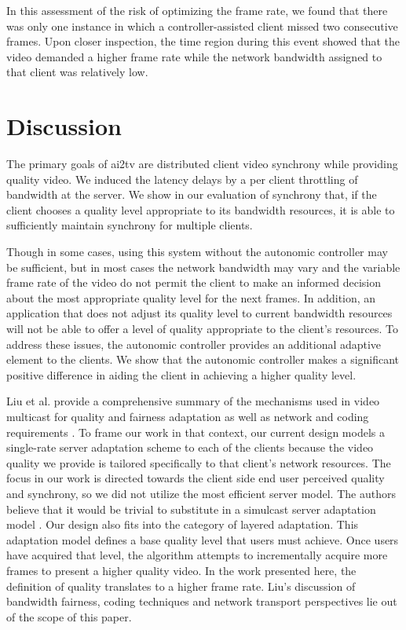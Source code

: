 \documentclass{sig-alternate}
\begin{document}
In this assessment of the risk of optimizing the frame rate, we found
that there was only one instance in which a controller-assisted client
missed two consecutive frames.  Upon closer inspection, the time
region during this event showed that the video demanded a higher frame
rate while the network bandwidth assigned to that client was
relatively low.


\section{Discussion} \label{discussion}
The primary goals of ai2tv are distributed client video synchrony
while providing quality video.  We induced the latency delays by a per
client throttling of bandwidth at the server.  We show in our
evaluation of synchrony that, if the client chooses a quality level
appropriate to its bandwidth resources, it is able to sufficiently
maintain synchrony for multiple clients.

Though in some cases, using this system without the autonomic
controller may be sufficient, but in most cases the network bandwidth
may vary and the variable frame rate of the video do not permit the
client to make an informed decision about the most appropriate quality
level for the next frames.  In addition, an application that does not
adjust its quality level to current bandwidth resources will not be
able to offer a level of quality appropriate to the client's
resources.  To address these issues, the autonomic controller provides
an additional adaptive element to the clients.  We show that the
autonomic controller makes a significant positive difference in aiding
the client in achieving a higher quality level.

Liu et al. provide a comprehensive summary of the mechanisms used in
video multicast for quality and fairness adaptation as well as network
and coding requirements \cite{LIU}.  To frame our work in that
context, our current design models a single-rate server adaptation
scheme to each of the clients because the video quality we provide is
tailored specifically to that client's network resources.  The focus
in our work is directed towards the client side end user perceived
quality and synchrony, so we did not utilize the most efficient server
model.  The authors believe that it would be trivial to substitute in
a simulcast server adaptation model \cite{CHEUNG,LI}.  Our design also
fits into the category of layered adaptation.  This adaptation model
defines a base quality level that users must achieve.  Once users have
acquired that level, the algorithm attempts to incrementally acquire
more frames to present a higher quality video.  In the work presented
here, the definition of quality translates to a higher frame rate.
Liu's discussion of bandwidth fairness, coding techniques and network
transport perspectives lie out of the scope of this paper.
\end{document}
